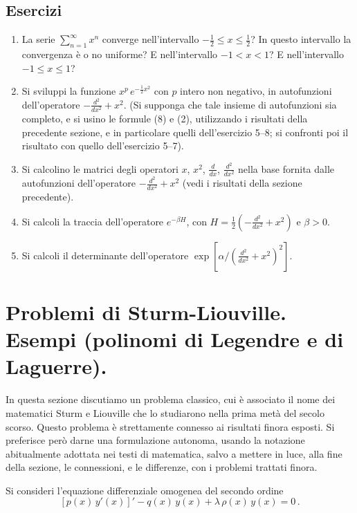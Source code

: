 \documentclass[11pt, a4paper]{book}
\numberwithin{equation}{section}
\newenvironment{esercizi}{\subsection*{Esercizi}\begin{enumerate}}{\end{enumerate}}
\begin{document}
\begin{esercizi}
\item La serie $\sum_{n=1}^{\infty} x^n$ converge nell'intervallo $-\frac{1}{2}\leq x\leq\frac{1}{2}$? In questo intervallo la convergenza è o no uniforme? E nell'intervallo $-1<x<1$? E nell'intervallo $-1\leq x\leq 1$?

\item Si sviluppi la funzione $x^p\, e^{-\frac{1}{2}x^2}$ con $p$ intero non negativo, in autofunzioni dell'operatore $-\frac{d^2}{dx^2}+x^2$. (Si supponga che tale insieme di autofunzioni sia completo, e si usino le formule (8) e (2), utilizzando i risultati della precedente sezione, e in particolare quelli dell'esercizio 5--8; si confronti poi il risultato con quello dell'esercizio 5--7).

\item Si calcolino le matrici degli operatori $x$, $x^2$, $\frac{d}{dx}$, $\frac{d^2}{dx^2}$ nella base fornita dalle autofunzioni dell'operatore $-\frac{d^2}{dx^2}+x^2$ (vedi i risultati della sezione precedente).

\item Si calcoli la traccia dell'operatore $e^{-\beta H}$, con $H=\frac{1}{2}\!\left(-\frac{d^2}{dx^2}+x^2\right)$ e $\beta>0$.

\item Si calcoli il determinante dell'operatore $\exp\!\left[\alpha\Big/\!\left(\frac{d^2}{dx^2}+x^2\right)^{\!2}\right]$.
\end{esercizi}

\section{Problemi di Sturm-Liouville. Esempi (polinomi di Legendre e di Laguerre).
}

In questa sezione discutiamo un problema classico, cui è associato il nome dei matematici Sturm e Liouville che lo studiarono nella prima metà del secolo scorso. Questo problema è strettamente connesso ai risultati finora esposti. Si preferisce però darne una formulazione autonoma, usando la notazione abitualmente adottata nei testi di matematica, salvo a mettere in luce, alla fine della sezione, le connessioni, e le differenze, con i problemi trattati finora.

Si consideri l'equazione differenziale omogenea del secondo ordine
\begin{equation}
\left[p(x)\,y'(x)\right]' - q(x)\,y(x) + \lambda\,\rho(x)\,y(x) = 0\,. \tag{1a}
\end{equation}
\end{document}
